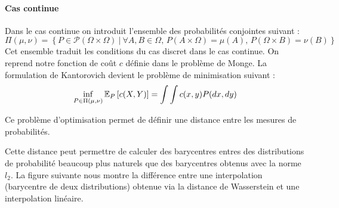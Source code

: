 \paragraph{Cas continue}
Dans le cas continue on introduit l'ensemble des probabilités conjointes suivant :
$$ \Pi(\mu, \nu) = \left\{ P \in \mathcal{P}(\Omega \times \Omega)~|~\forall A, B \in \Omega, \, P(A \times \Omega) = \mu(A), \, P(\Omega \times B) = \nu(B) \right\} $$
Cet ensemble traduit les conditions du cas discret dans le cas continue. On reprend notre fonction de coût $c$ définie dans le problème de Monge. La formulation de Kantorovich devient le problème de minimisation suivant :
$$ \inf_{P \in \Pi(\mu, \nu)} \mathbb{E}_P \left[ c(X, Y) \right] = \int \int c(x, y) P(dx, dy) $$


Ce problème d'optimisation permet de définir une distance entre les mesures de probabilités.


Cette distance peut permettre de calculer des barycentres entres des distributions de probabilité beaucoup plus naturels que des barycentres obtenus avec la norme $l_2$. La figure suivante nous montre la différence entre une interpolation (barycentre de deux distributions) obtenue via la distance de Wasserstein et une interpolation linéaire.

